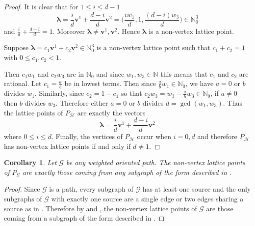 \documentclass [12pt,a4paper,reqno]{amsart}
\theoremstyle{plain}
\newtheorem{Corollary}[Theorem]{Corollary}
\theoremstyle{definition}
\newtheorem{Assumptions and Discussion}[Theorem]{Assumptions and Discussion}
\theoremstyle{remark}
\def\NN{{\mathbb N}}
\def\N{\operatorname{N}} %
\def\N{{\mathbb N}}
\newcommand\calG{\mathcal{G}}
\newcommand\calH{\mathcal{H}}
\begin{document}
\begin{proof}
It is clear that for $1\le i\le d-1$
$$\boldsymbol{\lambda}=\frac{i}{d}\mathbf{v}^1+\frac{d-i}{d}\mathbf{v}^2=\Big(\frac{iw_{1}}{d},1,\frac{(d-i)w_{3}}{d}\Big)\in \mathbb{N}_0^{3}$$ 
and $\frac{i}{d}+\frac{d-i}{d}=1$. Moreover $\boldsymbol{\lambda} \neq \mathbf{v}^{1}, \mathbf{v}^2$. Hence $\boldsymbol{\lambda}$ is a non-vertex lattice point.

Suppose $\boldsymbol{\lambda}=c_1\mathbf{v}^1+c_2\mathbf{v}^2 \in \NN_0^{3}$ is a non-vertex lattice point such that $c_1+c_2=1$ with $0\leq c_1, c_2 <1$. 

 Then $c_{1}w_{1}$ and $c_{2}w_{3}$ are in $\NN_0$ and since $w_{1}, w_{3} \in \N$ this means that $c_{1}$ and $c_{2}$ are rational.  Let $c_{1} = \frac{a}{b}$ be in lowest terms.  Then since $\frac{a}{b}w_{1} \in\NN_0$, we have $a=0$ or $b$ divides $w_{1}$.  Similarly, since $c_{2} = 1-c_{1}$ so that $c_{2}w_3= w_{3} - \frac{a}{b}w_{3} \in \NN_0$, if $a \neq 0$ then $b$ divides $w_{3}$.  Therefore either $a = 0$ or $b$ divides $d = \gcd(w_{1},w_{3})$.  Thus the lattice points of $P_\calH$ are exactly the vectors
 \[
 \boldsymbol{\lambda}=\frac{i}{d}\mathbf{v}^{1}+\frac{d-i}{d}\mathbf{v}^{2}
 \]
 where $0\leq i \leq d$.  Finally, the vertices of $P_\calH$  occur when $i = 0, d$ and therefore $P_\calH$ has non-vertex lattice points if and only if $d \neq 1$. 
\end{proof}


\begin{Corollary}\label{NonvertexPath}
Let $\calG$ be any weighted oriented path.  The non-vertex lattice points of $P_\calG$ are exactly those coming from any subgraph of the form described in .
\end{Corollary}

\begin{proof}
 Since $\calG$ is a path, every subgraph of $\calG$ has at least one source and the only subgraphs of $\calG$ with exactly one source are a single edge or two edges sharing a source as in .  Therefore by  and , the non-vertex lattice points of $\calG$ are those coming from a subgraph of the form described in .
\end{proof}
\end{document}
